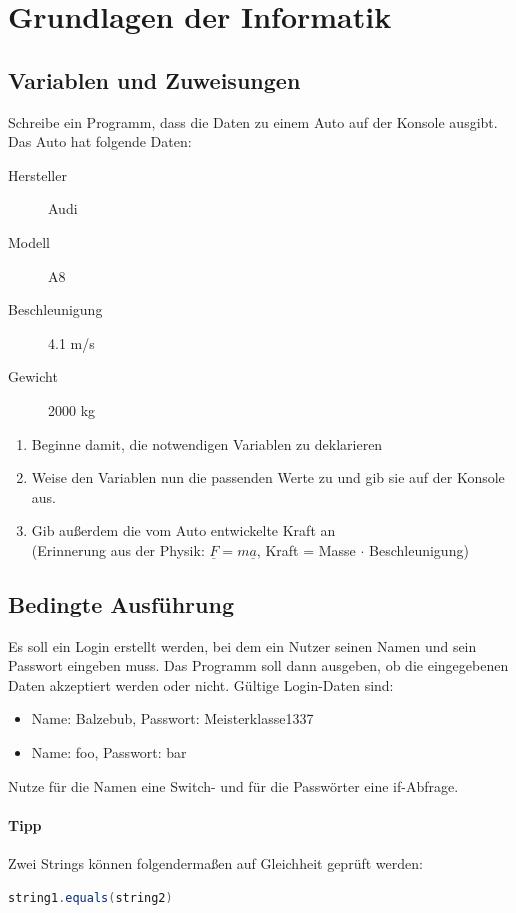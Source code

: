 \documentclass[11pt, a4paper]{article}
\renewcommand{\vec}[1]{\underline{#1}}
\newif\ifshowsolution
\begin{document}
\section{Grundlagen der Informatik}
\subsection{Variablen und Zuweisungen}
Schreibe ein Programm, dass die Daten zu einem Auto auf der Konsole ausgibt. Das Auto hat folgende Daten:
\begin{description}
	\item[Hersteller] Audi
	\item[Modell] A8
	\item[Beschleunigung] 4.1 m/s
	\item[Gewicht] 2000 kg
\end{description}
\begin{enumerate}
	\item Beginne damit, die notwendigen Variablen zu deklarieren
	\item Weise den Variablen nun die passenden Werte zu und gib sie auf der Konsole aus.
	\item Gib außerdem die vom Auto entwickelte Kraft an \\
	(Erinnerung aus der Physik: $\vec{F}=m\vec{a}$, Kraft = Masse $\cdot$ Beschleunigung)
\end{enumerate}

\ifshowsolution
	
\fi

\subsection{Bedingte Ausführung}
Es soll ein Login erstellt werden, bei dem ein Nutzer seinen Namen und sein Passwort eingeben muss. Das Programm soll dann ausgeben, ob die eingegebenen Daten akzeptiert werden oder nicht. Gültige Login-Daten sind:
\begin{itemize}
	\item Name: Balzebub, Passwort: Meisterklasse1337
	\item Name: foo, Passwort: bar
\end{itemize}
Nutze für die Namen eine Switch- und für die Passwörter eine if-Abfrage.
\paragraph{Tipp} Zwei Strings können folgendermaßen auf Gleichheit geprüft werden:
\begin{lstlisting}[language=Java]
	string1.equals(string2)
\end{lstlisting}
\end{document}
